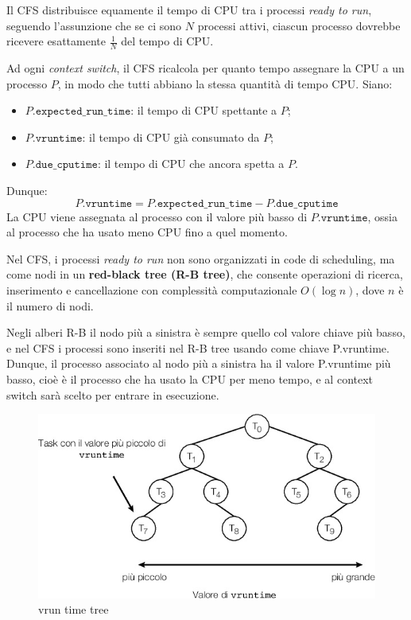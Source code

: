 Il CFS distribuisce equamente il tempo di CPU tra i processi \textit{ready to run}, seguendo l'assunzione che se ci sono $N$ processi attivi, ciascun processo dovrebbe ricevere esattamente $\frac{1}{N}$ del tempo di CPU.

Ad ogni \textit{context switch}, il CFS ricalcola per quanto tempo assegnare la CPU a un processo $P$, in modo che tutti abbiano la stessa quantità di tempo CPU. Siano:
\begin{itemize}
    \item $P.\texttt{expected\_run\_time}$: il tempo di CPU spettante a $P$;
    \item $P.\texttt{vruntime}$: il tempo di CPU già consumato da $P$;
    \item $P.\texttt{due\_cputime}$: il tempo di CPU che ancora spetta a $P$.
\end{itemize}

Dunque:
\[
P.\texttt{vruntime} = P.\texttt{expected\_run\_time} - P.\texttt{due\_cputime}
\]
La CPU viene assegnata al processo con il valore più basso di $P.\texttt{vruntime}$, ossia al processo che ha usato meno CPU fino a quel momento.

Nel CFS, i processi \textit{ready to run} non sono organizzati in code di scheduling, ma come nodi in un \textbf{red-black tree (R-B tree)}, che consente operazioni di ricerca, inserimento e cancellazione con complessità computazionale $O(\log n)$, dove $n$ è il numero di nodi.

Negli alberi R-B il nodo più a sinistra è sempre quello col valore chiave più basso, e nel CFS i processi sono inseriti nel R-B tree usando come chiave P.vruntime.
Dunque, il processo associato al nodo più a sinistra ha il valore P.vruntime più basso, cioè è il processo che ha usato la CPU per meno tempo, e al context switch sarà scelto per entrare in esecuzione.

\begin{figure}
    \centering
    \includegraphics[width=0.5\linewidth]{images/Scheduling-Linux-Tree.png}
    \caption{vrun time tree}
    \label{fig:v-runtimetree}
\end{figure}
